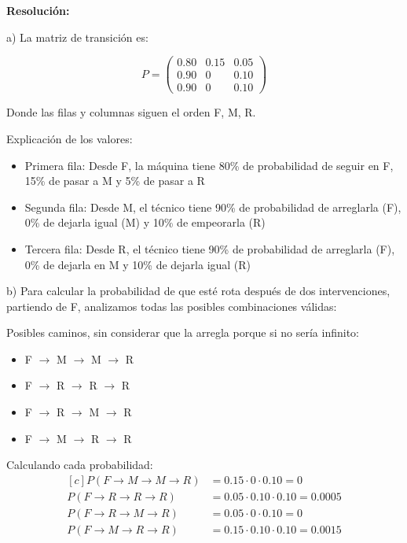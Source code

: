 \documentclass[a4paper,11pt]{article}
\begin{document}
\textbf{Resolución:}

\vspace{0.5em}

a) La matriz de transición es:

\[P = \begin{pmatrix}
0.80 & 0.15 & 0.05 \\
0.90 & 0 & 0.10 \\
0.90 & 0 & 0.10
\end{pmatrix}\]

\begin{center}
    Donde las filas y columnas siguen el orden F, M, R.
\end{center}

Explicación de los valores:
\begin{itemize}
    \item Primera fila: Desde F, la máquina tiene 80\% de probabilidad de seguir en F, 15\% de pasar a M y 5\% de pasar a R
    \item Segunda fila: Desde M, el técnico tiene 90\% de probabilidad de arreglarla (F), 0\% de dejarla igual (M) y 10\% de empeorarla (R)
    \item Tercera fila: Desde R, el técnico tiene 90\% de probabilidad de arreglarla (F), 0\% de dejarla en M y 10\% de dejarla igual (R)
\end{itemize}

b) Para calcular la probabilidad de que esté rota después de dos intervenciones, partiendo de F, analizamos todas las posibles combinaciones válidas:

\vspace{0.5em}
Posibles caminos, sin considerar que la arregla porque si no sería infinito:
\begin{itemize}
    \item F $\rightarrow$ M $\rightarrow$ M $\rightarrow$ R
    \item F $\rightarrow$ R $\rightarrow$ R $\rightarrow$ R
    \item F $\rightarrow$ R $\rightarrow$ M $\rightarrow$ R
    \item F $\rightarrow$ M $\rightarrow$ R $\rightarrow$ R
\end{itemize}

Calculando cada probabilidad:
\[
\begin{aligned}[c]
P(F \rightarrow M \rightarrow M \rightarrow R) &= 0.15 \cdot 0 \cdot 0.10 = 0 \\
P(F \rightarrow R \rightarrow R \rightarrow R) &= 0.05 \cdot 0.10 \cdot 0.10 = 0.0005 \\
P(F \rightarrow R \rightarrow M \rightarrow R) &= 0.05 \cdot 0 \cdot 0.10 = 0 \\
P(F \rightarrow M \rightarrow R \rightarrow R) &= 0.15 \cdot 0.10 \cdot 0.10 = 0.0015
\end{aligned}
\]
\end{document}
